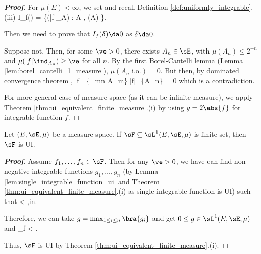 \begin{proof}[\bf Proof]
For $\mu(E) <\infty$, we set and recall Definition \ref{def:uniformly_integrable}.(iii)
\be
I_f(\delta) = \sup\{\mu(|f|\ind_A) : A \in \sE, \mu(A) \leq \delta\}.
\ee

Then we need to prove that $I_f(\delta) \da 0$ as $\delta \da 0$.

Suppose not. Then, for some $\ve > 0$, there exists $A_n \in \sE$, with $\mu(A_n) \leq 2^{-n}$ and $\mu(|f|\ind_{A_n}) \geq \ve$ for all $n$. By the first Borel-Cantelli lemma (Lemma
\ref{lem:borel_cantelli_1_measure}), $\mu(A_n \text{ i.o.}) = 0$. But then, by dominated convergence theorem ,
\be
|f|\ind_{\{\bigcup_{m\geq n} A_m\}} \to |f|\ind_{\{A_n\}} \quad\ra\quad \ve \leq \mu{} \to \mu{} = 0
\ee
which is a contradiction.

For more general case of measure space (as it can be infinite measure), we apply Theorem \ref{thm:ui_equivalent_finite_measure}.(i) by using $g = 2\abs{f}$ for integrable function $f$.
\end{proof}



\begin{proposition}\label{pro:finite_integrable_implies_ui}%
Let $(E,\sE,\mu)$ be a measure space. If $\sF\subseteq \sL^1(E,\sE,\mu)$ is finite set, then $\sF$ is UI.
\end{proposition}

\begin{proof}[\bf Proof]
Assume $f_1,\dots,f_n\in \sF$. Then for any $\ve >0$, we have can find non-negative integrable functions $g_1,\dots,g_n$ (by Lemma \ref{lem:single_integrable_function_ui} and Theorem
\ref{thm:ui_equivalent_finite_measure}.(i) as single integrable function is UI) such that
\be
\mu{} < \ve,\leq i\leq n.
\ee

Therefore, we can take $g = \max_{1\leq i\leq n}\bra{g_i}$ and get $0\leq g\in \sL^1(E,\sE,\mu)$ and
\be
\sup_{f\in \sF} \mu{} < \ve.
\ee

Thus, $\sF$ is UI by Theorem \ref{thm:ui_equivalent_finite_measure}.(i).%
\end{proof}

